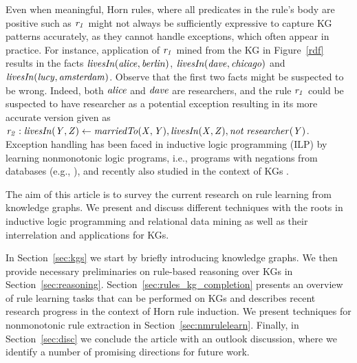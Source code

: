Even when meaningful, Horn rules, where all predicates in the rule's body are positive such as $\mathit{r_1}$ might not always be sufficiently expressive to capture KG patterns accurately, as they cannot handle exceptions, which often appear in practice. 
For instance, application of $\mathit{r_1}$ mined from the KG in Figure~\ref{rdf} results in the facts $\mathit{livesIn(alice,berlin)}$, $\mathit{livesIn(dave,chicago)}$ and $\mathit{livesIn(lucy,amsterdam)}$. Observe that the first two facts might be suspected to be wrong. Indeed, both $\mathit{alice}$ and $\mathit{dave}$ are researchers, and the rule $\mathit{r_1}$ could be suspected to have researcher as a potential exception resulting in its more accurate version given as $\mathit{r_2:\;}\mathit{livesIn(Y,Z)}\leftarrow \mathit{marriedTo(X,Y),livesIn(X,Z), not\;researcher(Y)}$.
Exception handling has been faced in inductive logic programming (ILP) by learning nonmonotonic logic programs, i.e., programs with negations from databases (e.g., \cite{DBLP:conf/ijcai/InoueK97,DBLP:journals/tocl/Sakama05,XHAIL}), and recently also studied in the context of KGs \cite{gad2016,rumis}.


The aim of this article is to survey the current research on rule learning from knowledge graphs. We present and discuss different techniques with the roots in inductive logic programming and relational data mining as well as their interrelation and applications for KGs. 

In Section~\ref{sec:kgs} we start by briefly introducing knowledge graphs. We then provide necessary preliminaries on rule-based reasoning over KGs in Section~\ref{sec:reasoning}. Section~\ref{sec:rules_kg_completion} presents an overview of rule learning tasks that can be performed on KGs and describes recent research progress in the context of Horn rule induction. We present techniques for nonmonotonic rule extraction in Section~\ref{sec:nmrulelearn}. Finally, in Section~\ref{sec:disc} we conclude the article with an outlook discussion, where we identify a number of promising directions for future work.

